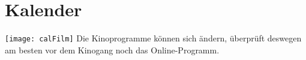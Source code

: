\chapter{Kalender}

\texttt{[image: calFilm]} %
Die Kinoprogramme können sich ändern, überprüft deswegen am besten vor dem Kinogang noch das Online-Programm.
